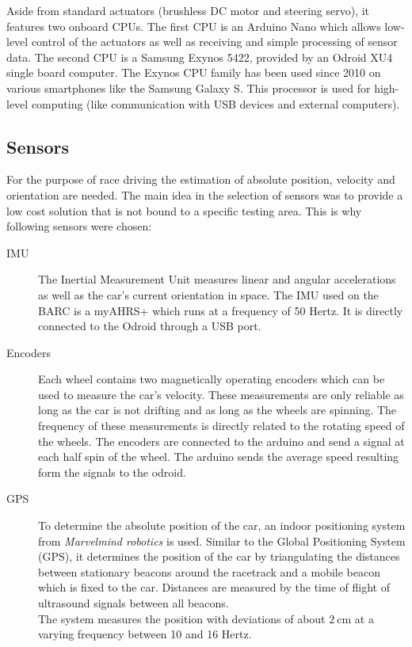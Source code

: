 Aside from standard actuators (brushless DC motor and steering servo), it features two onboard CPUs. The first CPU is an Arduino Nano which allows low-level control of the actuators as well as receiving and simple processing of sensor data. The second CPU is a Samsung Exynos 5422, provided by an Odroid XU4 single board computer. The Exynos CPU family has been used since 2010 on various smartphones like the Samsung Galaxy S. This processor is used for high-level computing (like communication with USB devices and external computers).
\subsection{Sensors}
For the purpose of race driving the estimation of absolute position, velocity and orientation are needed. The main idea in the selection of sensors was to provide a low cost solution that is not bound to a specific testing area. This is why following sensors were chosen:
\begin{description}
\item[IMU] The Inertial Measurement Unit measures linear and angular accelerations as well as the car's current orientation in space. The IMU used on the BARC is a myAHRS+ which runs at a frequency of 50 Hertz. It is directly connected to the Odroid through a USB port.
\item[Encoders] Each wheel contains two magnetically operating encoders which can be used to measure the car's velocity. These measurements are only reliable as long as the car is not drifting and as long as the wheels are spinning. The frequency of these measurements is directly related to the rotating speed of the wheels. The encoders are connected to the arduino and send a signal at each half spin of the wheel. The arduino sends the average speed resulting form the signals to the odroid.
\item[GPS] To determine the absolute position of the car, an indoor positioning system from \emph{Marvelmind robotics} \cite{marvelmind} is used. Similar to the Global Positioning System (GPS), it determines the position of the car by triangulating the distances between stationary beacons around the racetrack and a mobile beacon which is fixed to the car. Distances are measured by the time of flight of ultrasound signals between all beacons.\\
The system measures the position with deviations of about $\SI{2}{\centi\meter}$ at a varying frequency between 10 and 16 Hertz.
\end{description}

